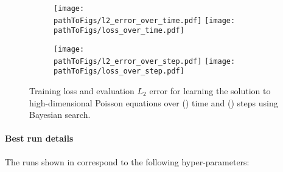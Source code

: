 \begin{figure}[!h]
  \centering
  \def\pathToFigs{../kfac_pinns_exp/exp33_poisson_bayes_groupplot}
  \begin{subfigure}[t]{1.0\linewidth}
    \caption{}\label{subfig:poisson-bayes-time}
    \texttt{[image: \\pathToFigs/l2\_error\_over\_time.pdf]}
    \texttt{[image: \\pathToFigs/loss\_over\_time.pdf]}
  \end{subfigure}
  \begin{subfigure}[t]{1.0\linewidth}
    \caption{}\label{subfig:poisson-bayes-step}
    \texttt{[image: \\pathToFigs/l2\_error\_over\_step.pdf]}
    \texttt{[image: \\pathToFigs/loss\_over\_step.pdf]}
  \end{subfigure}
  \caption{Training loss and evaluation $L_2$ error for learning the solution to high-dimensional Poisson equations over () time and () steps using Bayesian search.}\label{fig:poisson-bayes-appendix}
\end{figure}

\paragraph{Best run details} The runs shown in  correspond to the following hyper-parameters:

